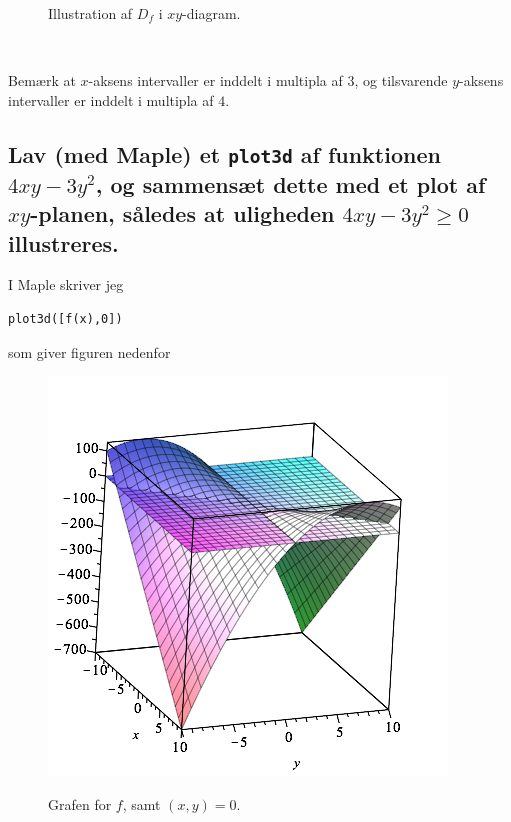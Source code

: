 \documentclass[11pt,a4paper]{article}
\begin{document}
\begin{multicols}{2}
\begin{figure}[H]
        \caption{Illustration af $D_f$ i $xy$-diagram.}
        \label{fig:5.1a}
    \end{figure}

    \vfill{\ }\columnbreak

    Bemærk at $x$-aksens intervaller er inddelt i multipla af $3$, og
    tilsvarende $y$-aksens intervaller er inddelt i multipla af $4$.

    \subsection
    {
        \mdseries
        Lav (med Maple) et {\tt plot3d} af funktionen $4xy - 3y^2$, og
        sammensæt dette med et plot af $xy$-planen, således at uligheden
        $4xy - 3y^2 \geq 0$ illustreres.
    }
    I Maple skriver jeg
    \begin{lstlisting}
plot3d([f(x),0])
    \end{lstlisting}

    som giver figuren nedenfor
    \begin{figure}[H]
        \centering
        \includegraphics[scale=0.5]{figures/5-1b.png}
        \label{fig:5.1b}
        \caption{Grafen for $f$, samt $(x,y) = 0$.}
    \end{figure}

\end{multicols}
\end{document}
